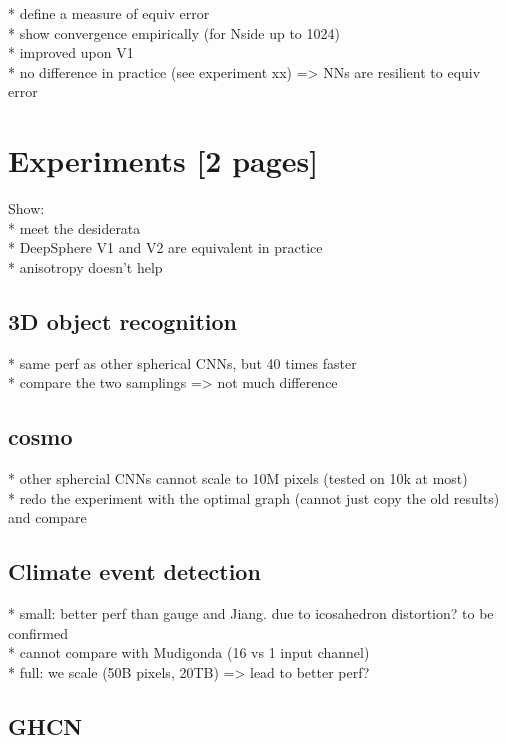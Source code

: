 \documentclass{article} %
\begin{document}
* define a measure of equiv error\\
* show convergence empirically (for Nside up to 1024) \\
* improved upon V1\\
* no difference in practice (see experiment xx) => NNs are resilient to equiv error\\

\section{Experiments [2 pages]}

Show: \\
* meet the desiderata \\
* DeepSphere V1 and V2 are equivalent in practice \\
* anisotropy doesn't help \\

\subsection{3D object recognition}

* same perf as other spherical CNNs, but 40 times faster \\
* compare the two samplings => not much difference \\

\subsection{cosmo}

* other sphercial CNNs cannot scale to 10M pixels (tested on 10k at most) \\
* redo the experiment with the optimal graph (cannot just copy the old results) and compare \\

\subsection{Climate event detection}

* small: better perf than gauge and Jiang. due to icosahedron distortion? to be confirmed\\
* cannot compare with Mudigonda (16 vs 1 input channel)\\
* full: we scale (50B pixels, 20TB) => lead to better perf?\\

\subsection{GHCN}
\end{document}
